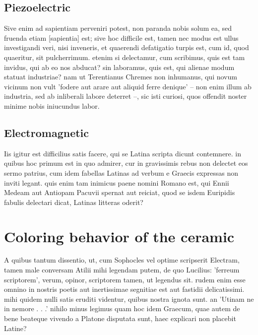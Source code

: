 \subsection{Piezoelectric}
Sive enim ad sapientiam perveniri potest, non paranda nobis solum ea, sed fruenda etiam [sapientia] est; sive hoc difficile est, tamen nec modus est ullus investigandi veri, nisi inveneris, et quaerendi defatigatio turpis est, cum id, quod quaeritur, sit pulcherrimum. etenim si delectamur, cum scribimus, quis est tam invidus, qui ab eo nos abducat? sin laboramus, quis est, qui alienae modum statuat industriae? nam ut Terentianus Chremes non inhumanus, qui novum vicinum non vult 'fodere aut arare aut aliquid ferre denique' -- non enim illum ab industria, sed ab inliberali labore deterret --, sic isti curiosi, quos offendit noster minime nobis iniucundus labor.

\subsection{Electromagnetic}
\label{sec:freiheitsgrad_eines_getriebes}
Iis igitur est difficilius satis facere, qui se Latina scripta dicunt contemnere. in quibus hoc primum est in quo admirer, cur in gravissimis rebus non delectet eos sermo patrius, cum idem fabellas Latinas ad verbum e Graecis expressas non inviti legant. quis enim tam inimicus paene nomini Romano est, qui Ennii Medeam aut Antiopam Pacuvii spernat aut reiciat, quod se isdem Euripidis fabulis delectari dicat, Latinas litteras oderit?



\section{Coloring behavior of the ceramic}
\label{sec:grundlagen_für_die_kinematischen_betrachtungen}
A quibus tantum dissentio, ut, cum Sophocles vel optime scripserit Electram, tamen male conversam Atilii mihi legendam putem, de quo Lucilius: 'ferreum scriptorem', verum, opinor, scriptorem tamen, ut legendus sit. rudem enim esse omnino in nostris poetis aut inertissimae segnitiae est aut fastidii delicatissimi. mihi quidem nulli satis eruditi videntur, quibus nostra ignota sunt. an 'Utinam ne in nemore . . .' nihilo minus legimus quam hoc idem Graecum, quae autem de bene beateque vivendo a Platone disputata sunt, haec explicari non placebit Latine?


